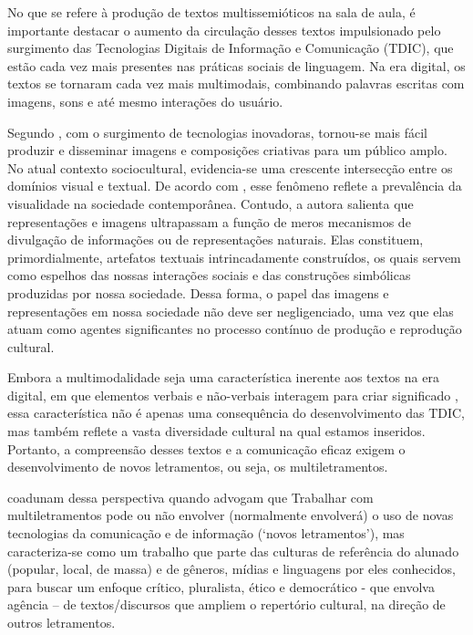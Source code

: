 \documentclass[portuguese]{textolivre}
\begin{document}
No que se refere à produção de textos multissemióticos na sala de aula, é importante destacar o aumento da circulação desses textos impulsionado pelo surgimento das Tecnologias Digitais de Informação e Comunicação (TDIC), que estão cada vez mais presentes nas práticas sociais de linguagem. Na era digital, os textos se tornaram cada vez mais multimodais, combinando palavras escritas com imagens, sons e até mesmo interações do usuário.

Segundo \textcite{dioni2005generos}, com o surgimento de tecnologias inovadoras, tornou-se mais fácil produzir e disseminar imagens e composições criativas para um público amplo. No atual contexto sociocultural, evidencia-se uma crescente intersecção entre os domínios visual e textual. De acordo com \textcite{dioni2005generos}, esse fenômeno reflete a prevalência da visualidade na sociedade contemporânea. Contudo, a autora salienta que representações e imagens ultrapassam a função de meros mecanismos de divulgação de informações ou de representações naturais. Elas constituem, primordialmente, artefatos textuais intrincadamente construídos, os quais servem como espelhos das nossas interações sociais e das construções simbólicas produzidas por nossa sociedade. Dessa forma, o papel das imagens e representações em nossa sociedade não deve ser negligenciado, uma vez que elas atuam como agentes significantes no processo contínuo de produção e reprodução cultural.

Embora a multimodalidade seja uma característica inerente aos textos na era digital, em que elementos verbais e não-verbais interagem para criar significado \cite{dioni2005generos}, essa característica não é apenas uma consequência do desenvolvimento das TDIC, mas também reflete a vasta diversidade cultural na qual estamos inseridos. Portanto, a compreensão desses textos e a comunicação eficaz exigem o desenvolvimento de novos letramentos, ou seja, os multiletramentos.

\textcite[p. 8]{rojo2012moura} coadunam dessa perspectiva quando advogam que Trabalhar com multiletramentos pode ou não envolver (normalmente envolverá) o uso de novas tecnologias da comunicação e de informação (‘novos letramentos’), mas caracteriza-se como um trabalho que parte das culturas de referência do alunado (popular, local, de massa) e de gêneros, mídias e linguagens por eles conhecidos, para buscar um enfoque crítico, pluralista, ético e democrático - que envolva agência – de textos/discursos que ampliem o repertório cultural, na direção de outros letramentos.
\end{document}
